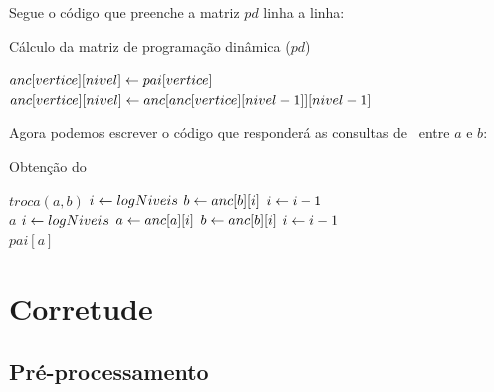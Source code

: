 \vspace{0.1cm}

Segue o código que preenche a matriz $pd$ linha a linha:

\begin{algorithm}[H]
\caption{Cálculo da matriz de programação dinâmica ($pd$)}
\begin{algorithmic}[1]
                \State $anc[vertice][nivel] \leftarrow pai[vertice]$
            \Else
                \State $anc[vertice][nivel] \leftarrow anc[anc[vertice][nivel-1]][nivel-1]$
            \EndIf
        \EndFor
    \EndFor
\EndFunction
\end{algorithmic}
\end{algorithm}

Agora podemos escrever o código que responderá as consultas de \LCA\ entre $a$ e $b$:


\begin{algorithm}[H]
\caption{Obtenção do \LCA}
\begin{algorithmic}[1]
        \State $troca(a, b)$
    \EndIf
    \State $i \leftarrow logNiveis$
            \State $b \leftarrow anc[b][i]$
        \EndIf
        \vspace{-0.2cm}
        \State $i \leftarrow i - 1$
    \EndWhile
        \\\hspace{11mm} \Return $a$
    \EndIf
    \State $i \leftarrow logNiveis$
            \State $a \leftarrow anc[a][i]$
            \State $b \leftarrow anc[b][i]$
        \EndIf
        \vspace{-0.2cm}
        \State $i \leftarrow i - 1$
    \EndWhile
    \\\hspace{5mm} \Return $pai[a]$
\EndFunction
\end{algorithmic}
\end{algorithm}

\vspace{10cm}

\section{Corretude}

\subsection{Pré-processamento}

